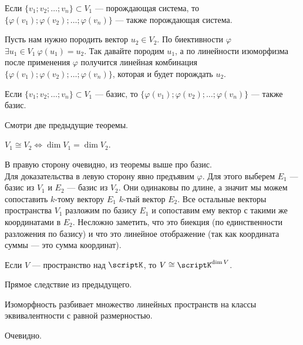 \documentclass{article}
\begin{document}
\begin{itemize}
\begin{Proof}
        \end{Proof}
        \thm Если $\{v_1;v_2;\ldots;v_n\}\subset V_1$ --- порождающая система, то $\{\varphi(v_1);\varphi(v_2);\ldots;\varphi(v_n)\}$ --- также порождающая система.
        \begin{Proof}
            Пусть нам нужно породить вектор $u_2\in V_2$. По биективности $\varphi$ $\exists u_1\in V_1~\varphi(u_1)=u_2$. Так давайте породим $u_1$, а по линейности изоморфизма после применения $\varphi$ получится линейная комбинация $\{\varphi(v_1);\varphi(v_2);\ldots;\varphi(v_n)\}$, которая и будет порождать $u_2$.
        \end{Proof}
        \thm Если $\{v_1;v_2;\ldots;v_n\}\subset V_1$ --- базис, то $\{\varphi(v_1);\varphi(v_2);\ldots;\varphi(v_n)\}$ --- также базис.
        \begin{Proof}
            Смотри две предыдущие теоремы.
        \end{Proof}
        \thm $V_1\cong V_2\Leftrightarrow\dim V_1=\dim V_2$.
        \begin{Proof}
            В правую сторону очевидно, из теоремы выше про базис.\\
            Для доказательства в левую сторону явно предъявим $\varphi$. Для этого выберем $E_1$ --- базис из $V_1$ и $E_2$ --- базис из $V_2$. Они одинаковы по длине, а значит мы можем сопоставить $k$-тому вектору $E_1$ $k$-тый вектор $E_2$. Все остальные векторы пространства $V_1$ разложим по базису $E_1$ и сопоставим ему вектор с такими же координатами в $E_2$. Несложно заметить, что это биекция (по единственности разложения по базису) и что это линейное отображение (так как координата суммы --- это сумма координат).
        \end{Proof}
        \thm Если $V$ --- пространство над $\scriptK$, то $V\cong\scriptK^{\dim V}$.
        \begin{Proof}
            Прямое следствие из предыдущего.
        \end{Proof}
        \thm Изоморфность разбивает множество линейных пространств на классы эквивалентности с равной размерностью.
        \begin{Proof}
            Очевидно.
        \end{Proof}
    \end{itemize}
\end{document}
